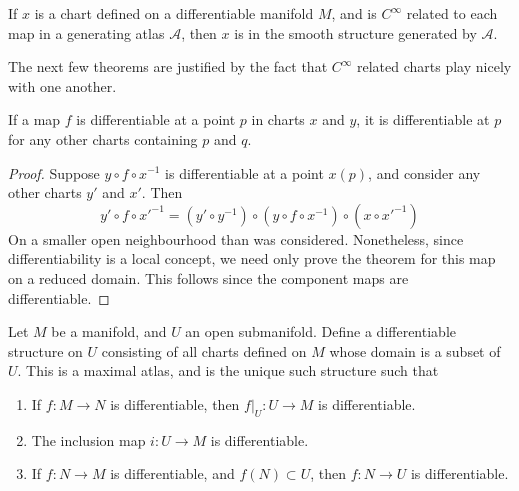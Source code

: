 \begin{corollary}
    If $x$ is a chart defined on a differentiable manifold $M$, and is $C^\infty$ related to each map in a generating atlas $\mathcal{A}$, then $x$ is in the smooth structure generated by $\mathcal{A}$.
\end{corollary}

The next few theorems are justified by the fact that $C^\infty$ related charts play nicely with one another.

\begin{lemma}
    If a map $f$ is differentiable at a point $p$ in charts $x$ and $y$, it is differentiable at $p$ for any other charts containing $p$ and $q$.
\end{lemma}
\begin{proof}
    Suppose $y \circ f \circ x^{-1}$ is differentiable at a point $x(p)$, and consider any other charts $y'$ and $x'$. Then
    \[ y' \circ f \circ x'^{-1} = (y' \circ y^{-1}) \circ (y \circ f \circ x^{-1}) \circ (x \circ x'^{-1}) \]
    On a smaller open neighbourhood than was considered. Nonetheless, since differentiability is a local concept, we need only prove the theorem for this map on a reduced domain. This follows since the component maps are differentiable.
\end{proof}

\begin{example}
    Let $M$ be a manifold, and $U$ an open submanifold. Define a differentiable structure on $U$ consisting of all charts defined on $M$ whose domain is a subset of $U$. This is a maximal atlas, and is the unique such structure such that
    \begin{enumerate}
        \item If $f: M \to N$ is differentiable, then $f|_U: U \to M$ is differentiable.
        \item The inclusion map $i:U \to M$ is differentiable.
        \item If $f: N \to M$ is differentiable, and $f(N) \subset U$, then $f: N \to U$ is differentiable.
    \end{enumerate}
\end{example}

